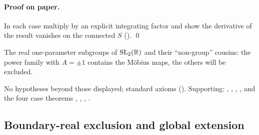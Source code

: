 \paragraph{Proof on paper.}  In each case multiply by an explicit integrating factor and show the derivative of the result
vanishes on the connected $S$ (). \qed
\begin{physics}The real one-parameter subgroups of $\mathrm{SL}_2(\mathbb{R})$ and their ``non-group'' cousins: the power family
with $A=\pm1$ contains the M\"obius maps, the others will be excluded.\end{physics}
\begin{status}No hypotheses beyond those displayed; standard axioms ().
Supporting: , , ,
, and the four case theorems , ,
, .\end{status}

\subsection{Boundary-real exclusion and global extension}

